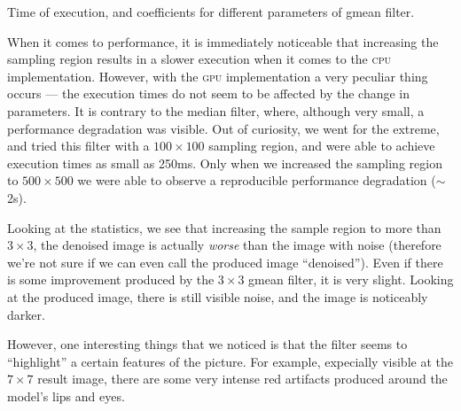 \documentclass[12pt]{article}
\theoremstyle{definition}
\begin{document}
\begin{table}[H]\centering
    \caption{Time of execution, and coefficients for different parameters of gmean filter.}
\end{table}

When it comes to performance, it is immediately noticeable 
that increasing the sampling region results in a slower execution when it comes to the \textsc{cpu} implementation.
However, with the \textsc{gpu} implementation a very peculiar thing occurs --- the execution times do not seem to be affected by the change in parameters.
It is contrary to the median filter, where, although very small, a performance degradation was visible.
Out of curiosity, we went for the extreme, and tried this filter with a $100\times100$ sampling region, and were able to achieve execution times as small as 250ms.
Only when we increased the sampling region to $500\times500$ we were able to observe a reproducible performance degradation ($\sim$2s).

Looking at the statistics, we see that increasing the sample region to more than $3\times3$, 
the denoised image is actually \emph{worse} than the image with noise 
(therefore we're not sure if we can even call the produced image ``denoised'').
Even if there is some improvement produced by the $3\times3$ gmean filter, it is very slight.
Looking at the produced image, there is still visible noise, and the image is noticeably darker.

However, one interesting things that we noticed is that the filter seems to ``highlight'' a certain features of the picture.
For example, expecially visible at the $7\times7$ result image, there are some very intense red artifacts produced around the model's lips and eyes.
\end{document}
